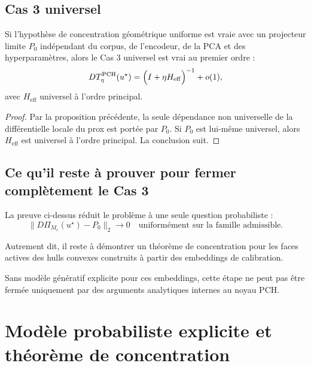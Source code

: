 \subsection{Cas 3 universel}

\begin{theorem}
Si l'hypothèse de concentration géométrique uniforme est vraie avec un projecteur limite \(P_0\) indépendant du corpus, de l'encodeur, de la PCA et des hyperparamètres, alors le Cas 3 universel est vrai au premier ordre :
\[
DT_\eta^{\mathrm{PCH}}(u^\star)
=
\Bigl(I+\eta H_{\mathrm{eff}}\Bigr)^{-1}
+
o(1),
\]
avec \(H_{\mathrm{eff}}\) universel à l'ordre principal.
\end{theorem}

\begin{proof}
Par la proposition précédente, la seule dépendance non universelle de la différentielle locale du prox est portée par \(P_0\).  
Si \(P_0\) est lui-même universel, alors \(H_{\mathrm{eff}}\) est universel à l'ordre principal.  
La conclusion suit.
\end{proof}

\subsection{Ce qu'il reste à prouver pour fermer complètement le Cas 3}

La preuve ci-dessus réduit le problème à une seule question probabiliste :
\[
\|D\Pi_{M_c}(u^\star)-P_0\|_2\to 0
\quad\text{uniformément sur la famille admissible.}
\]

Autrement dit, il reste à démontrer un théorème de concentration pour les faces actives des hulls convexes construits à partir des embeddings de calibration.

Sans modèle génératif explicite pour ces embeddings, cette étape ne peut pas être fermée uniquement par des arguments analytiques internes au noyau PCH.







\section{Modèle probabiliste explicite et théorème de concentration}

